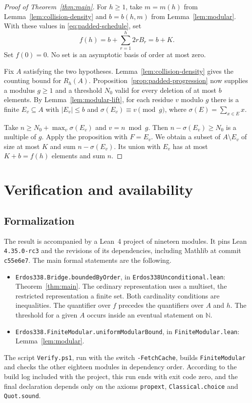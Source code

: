 \documentclass[11pt,reqno]{amsart}
\theoremstyle{definition}
\theoremstyle{remark}
\newcommand{\lean}[1]{\nolinkurl{#1}}
\begin{document}
\begin{proof}[Proof of Theorem~\ref{thm:main}]
For \(h\ge1\), take \(m=m(h)\) from Lemma~\ref{lem:collision-density}
and \(b=b(h,m)\) from Lemma~\ref{lem:modular}. With these values in
\eqref{eq:padded-schedule}, set
\[
   f(h)=b+\sum_{r=1}^h 2rB_r=b+K .
\]
Set \(f(0)=0\). No set is an asymptotic basis of order at most zero.

Fix \(A\) satisfying the two hypotheses. Lemma~\ref{lem:collision-density}
gives the counting bound for \(R_h(A)\). Proposition~\ref{prop:padded-progression}
now supplies a modulus \(g\ge1\) and a threshold \(N_0\) valid for every
deletion of at most \(b\) elements. By Lemma~\ref{lem:modular-lift},
for each residue \(v\) modulo \(g\) there is a finite \(E_v\subseteq A\)
with \(|E_v|\le b\) and \(\sigma(E_v)\equiv v\pmod g\), where
\(\sigma(E)=\sum_{x\in E}x\).

Take \(n\ge N_0+\max_v\sigma(E_v)\) and \(v=n\bmod g\).
Then \(n-\sigma(E_v)\ge N_0\) is a multiple of \(g\).
Apply the proposition with \(F=E_v\). We obtain a subset of
\(A\setminus E_v\) of size at most \(K\) and sum \(n-\sigma(E_v)\).
Its union with \(E_v\) has at most \(K+b=f(h)\) elements and sum \(n\).
\end{proof}

\section{Verification and availability}\label{sec:verification}

\subsection{Formalization}
The result is accompanied by a Lean~4 project of nineteen modules. It pins Lean \lean{4.35.0-rc3} and the revisions of its dependencies, including Mathlib at commit \lean{c55e6e7}. The main formal statements are the following.
\begin{itemize}[leftmargin=2em]
\item \lean{Erdos338.Bridge.boundedByOrder}, in \lean{Erdos338Unconditional.lean}: Theorem~\ref{thm:main}. The ordinary representation uses a multiset, the restricted representation a finite set. Both cardinality conditions are inequalities. The quantifier over \(f\) precedes the quantifiers over \(A\) and \(h\). The threshold for a given \(A\) occurs inside an eventual statement on \(\mathbb N\).
\item \lean{Erdos338.FiniteModular.uniformModularBound}, in \lean{FiniteModular.lean}: Lemma~\ref{lem:modular}.
\end{itemize}
The script \lean{Verify.ps1}, run with the switch \lean{-FetchCache}, builds \lean{FiniteModular} and checks the other eighteen modules in dependency order. According to the build log included with the project, this run ends with exit code zero, and the final declaration depends only on the axioms \lean{propext}, \lean{Classical.choice} and \lean{Quot.sound}.
\end{document}
